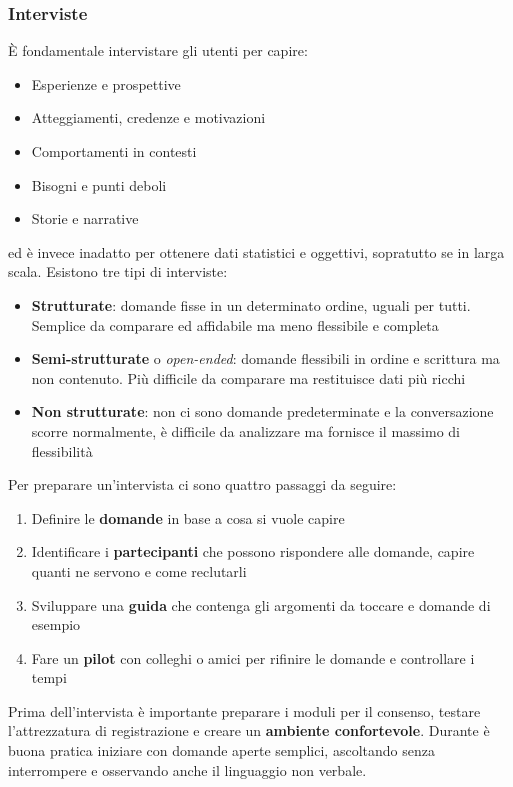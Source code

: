 \subsubsection{Interviste}
È fondamentale intervistare gli utenti per capire:
\begin{itemize}
	\item Esperienze e prospettive
	\item Atteggiamenti, credenze e motivazioni
	\item Comportamenti in contesti
	\item Bisogni e punti deboli
	\item Storie e narrative
\end{itemize}
ed è invece inadatto per ottenere dati statistici e oggettivi, sopratutto se in larga scala. Esistono tre tipi di interviste:
\begin{itemize}
	\item \textbf{Strutturate}: domande fisse in un determinato ordine, uguali per tutti. Semplice da comparare ed affidabile ma meno flessibile e completa
	\item \textbf{Semi-strutturate} o \textit{open-ended}: domande flessibili in ordine e scrittura ma non contenuto. Più difficile da comparare ma restituisce dati più ricchi
	\item \textbf{Non strutturate}: non ci sono domande predeterminate e la conversazione scorre normalmente, è difficile da analizzare ma fornisce il massimo di flessibilità
\end{itemize}
Per preparare un'intervista ci sono quattro passaggi da seguire:
\begin{enumerate}
	\item Definire le \textbf{domande} in base a cosa si vuole capire
	\item Identificare i \textbf{partecipanti} che possono rispondere alle domande, capire quanti ne servono e come reclutarli
	\item Sviluppare una \textbf{guida} che contenga gli argomenti da toccare e domande di esempio
	\item Fare un \textbf{pilot} con colleghi o amici per rifinire le domande e controllare i tempi
\end{enumerate}
Prima dell'intervista è importante preparare i moduli per il consenso, testare l'attrezzatura di registrazione e creare un \textbf{ambiente confortevole}. Durante è buona pratica iniziare con domande aperte semplici, ascoltando senza interrompere e osservando anche il linguaggio non verbale.

